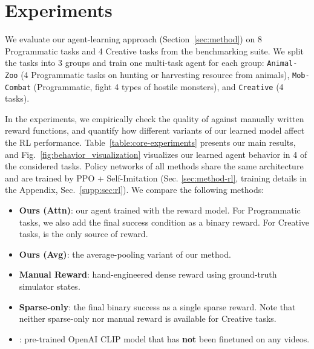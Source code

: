 

\section{Experiments}
\label{sec:experiments}

We evaluate our agent-learning approach (Section~\ref{sec:method}) on 8 Programmatic tasks and 4 Creative tasks from the \minedojo benchmarking suite.  We split the tasks into 3 groups and train one multi-task agent for each group: \texttt{Animal-Zoo} (4 Programmatic tasks on hunting or harvesting resource from animals), \texttt{Mob-Combat} (Programmatic, fight 4 types of hostile monsters), and \texttt{Creative} (4 tasks).  

In the experiments, we empirically check the quality of \mineclip against manually written reward functions, and quantify how different variants of our learned model affect the RL performance. Table~\ref{table:core-experiments} presents our main results, and Fig.~\ref{fig:behavior_visualization} visualizes our learned agent behavior in 4 of the considered tasks. 
Policy networks of all methods share the same architecture and are trained by PPO + Self-Imitation (Sec. \ref{sec:method-rl}, training details in the Appendix, Sec.~\ref{supp:sec:rl}). We compare the following methods: 

\begin{itemize}[leftmargin=3em,labelsep=0.7em]
    \item \textbf{Ours (Attn)}: our agent trained with the \mineclipattn reward model. For Programmatic tasks, we also add the final success condition as a binary reward. For Creative tasks, \mineclip is the only source of reward. 
    \item \textbf{Ours (Avg)}: the average-pooling variant of our method.  
    \item \textbf{Manual Reward}: hand-engineered dense reward using ground-truth simulator states. 
    \item \textbf{Sparse-only}: the final binary success as a single sparse reward. Note that neither sparse-only nor manual reward is available for Creative tasks.
    \item \textbf{\openaiclip}: pre-trained OpenAI CLIP model that has \textbf{not} been finetuned on any \minedojo videos. 
\end{itemize}


